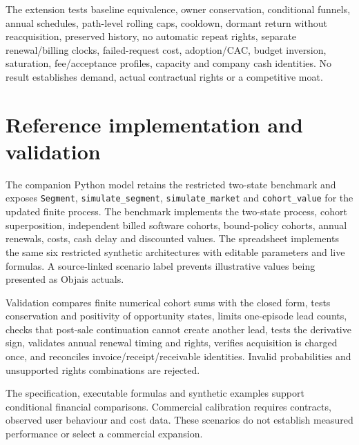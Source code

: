\documentclass[11pt,a4paper]{article}
\begin{document}
The extension tests baseline equivalence, owner conservation, conditional funnels, annual schedules, path-level rolling caps, cooldown, dormant return without reacquisition, preserved history, no automatic repeat rights, separate renewal/billing clocks, failed-request cost, adoption/CAC, budget inversion, saturation, fee/acceptance profiles, capacity and company cash identities. No result establishes demand, actual contractual rights or a competitive moat.

\section{Reference implementation and validation}

The companion Python model retains the restricted two-state benchmark and exposes \texttt{Segment}, \texttt{simulate\_segment}, \texttt{simulate\_market} and \texttt{cohort\_value} for the updated finite process. The benchmark implements the two-state process, cohort superposition, independent billed software cohorts, bound-policy cohorts, annual renewals, costs, cash delay and discounted values. The spreadsheet implements the same six restricted synthetic architectures with editable parameters and live formulas. A source-linked scenario label prevents illustrative values being presented as Objais actuals.

Validation compares finite numerical cohort sums with the closed form, tests conservation and positivity of opportunity states, limits one-episode lead counts, checks that post-sale continuation cannot create another lead, tests the derivative sign, validates annual renewal timing and rights, verifies acquisition is charged once, and reconciles invoice/receipt/receivable identities. Invalid probabilities and unsupported rights combinations are rejected.

The specification, executable formulas and synthetic examples support conditional financial comparisons. Commercial calibration requires contracts, observed user behaviour and cost data. These scenarios do not establish measured performance or select a commercial expansion.
\end{document}
